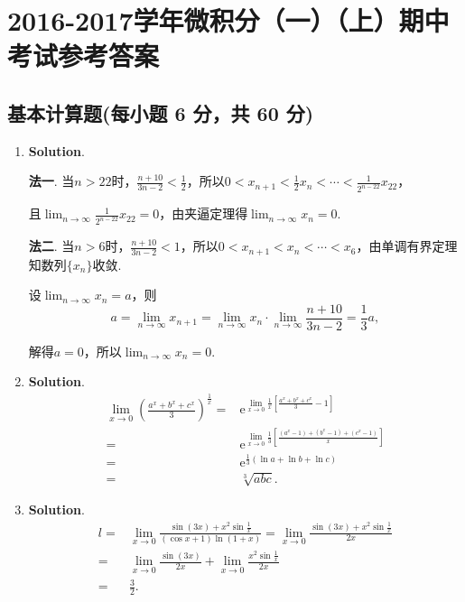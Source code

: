 \documentclass[../Main.tex]{subfiles}
\begin{document}
\chapter{2016-2017学年微积分（一）（上）期中考试参考答案}
\section{基本计算题(每小题 6 分，共 60 分)}
\begin{enumerate}
    \item \textbf{Solution}.

          \textbf{法一}. 当$n>22$时，$\frac{n+10}{3n-2}<\frac{1}{2}$，所以$0<x_{n+1}<
              \frac{1}{2}x_{n}<\cdots<\frac{1}{2^{n-22}}x_{22}$，

          且$\lim_{n\to\infty}\frac{1}{2^{n-22}}x_{22}=0$，由夹逼定理得$\lim_{n\to\infty}
              x_{n}=0$.

          \textbf{法二}. 当$n>6$时，$\frac{n+10}{3n-2}<1$，所以$0<x_{n+1}<x_{n}<\cdots
              <x_{6}$，由单调有界定理知数列$\{x_{n}\}$收敛.

          设$\lim_{n\to\infty}x_{n}=a$，则
          \[
              a=\lim_{n\to\infty}x_{n+1}=\lim_{n\to\infty}x_{n}\cdot\lim_{n\to\infty}\frac{n+10}{3n-2}
              =\frac{1}{3}a,
          \]

          解得$a=0$，所以$\lim_{n\to\infty}x_{n}=0$.

    \item \textbf{Solution}.
          \[
              \begin{aligned}
                  \lim_{x\to0}\left(\frac{a^x+b^x+c^x}{3}\right)^{\frac{1}{x}}= & \mathrm{e}^{\lim\limits_{x\to0}\frac{1}{x}\left[\frac{a^x+b^x+c^x}{3}-1\right]}           \\
                  =                                                             & \mathrm{e}^{\lim\limits_{x\to0}\frac{1}{3}\left[\frac{(a^x-1)+(b^x-1)+(c^x-1)}{x}\right]} \\
                  =                                                             & \mathrm{e}^{\frac{1}{3}(\ln a+\ln b+\ln c)}                                               \\
                  =                                                             & \sqrt[3]{abc}.
              \end{aligned}
          \]

    \item \textbf{Solution}.
          \[
              \begin{aligned}
                  l= & \lim_{x\to0}\frac{\sin(3x)+x^2\sin\frac{1}{x}}{(\cos x+1)\ln(1+x)}= \lim_{x\to0}\frac{\sin(3x)+x^2\sin\frac{1}{x}}{2x} \\
                  =  & \lim_{x\to0}\frac{\sin(3x)}{2x}+\lim_{x\to0}\frac{x^2\sin\frac{1}{x}}{2x}                                              \\
                  =  & \frac{3}{2}.
              \end{aligned}
          \]


\end{enumerate}
\end{document}
